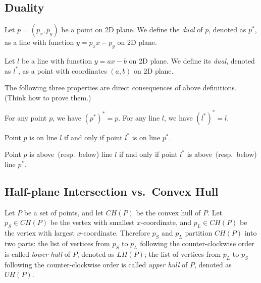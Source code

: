 \subsection*{Duality}

\begin{definition}
Let $p = (p_x, p_y)$ be a point on 2D plane. We define the \emph{dual} of $p$, denoted as $p^*$, as
a line with function $y = p_x x - p_y$ on 2D plane.
\end{definition}

\begin{definition}
Let $l$ be a line with function $y = ax-b$ on 2D plane. We define its \emph{dual}, denoted as $l^*$,
as a point with coordinates $(a,b)$ on 2D plane.
\end{definition}

The following three properties are direct consequences of above definitions. (Think how to prove them.)

\begin{property}
For any point $p$, we have $(p^*)^* = p$. 
For any line $l$, we have $(l^*)^* = l$. 
\end{property}

\begin{property}
Point $p$ is on line $l$ if and only if point $l^*$ is on line $p^*$.
\end{property}

\begin{property}
Point $p$ is above~(resp.\ below) line $l$ if and only if point $l^*$ is above~(resp.\ below) line $p^*$.
\end{property}


\subsection*{Half-plane Intersection vs.\ Convex Hull}

\begin{definition}
Let $P$ be a set of points, and let $CH(P)$ be the convex hull of $P$.
Let $p_S\in CH(P)$ be the vertex with smallest $x$-coordinate,
and $p_L\in CH(P)$ be the vertex with largest $x$-coordinate.
Therefore $p_S$ and $p_L$ partition $CH(P)$ into two parts:
the list of vertices from $p_S$ to $p_L$ following the counter-clockwise order is called \emph{lower hull} of $P$, denoted as $LH(P)$;
the list of vertices from $p_L$ to $p_S$ following the counter-clockwise order is called \emph{upper hull} of $P$, denoted as $UH(P)$.
\end{definition}

